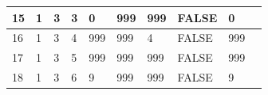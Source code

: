 \begin{table}[h!]
\begin{tabular}{|l|l|l|l|l|l|l|l|l|l|}
		15                                                          & 1                                                       & 3                                                       & 3                                                       & 0                                                                        & 999                                                                      & 999                                                                      & FALSE                                                           & 0                                                                        &                                                               \\ \hline
		16                                                          & 1                                                       & 3                                                       & 4                                                       & 999                                                                      & 999                                                                      & 4                                                                        & FALSE                                                           & 999                                                                      &                                                               \\ \hline
		17                                                          & 1                                                       & 3                                                       & 5                                                       & 999                                                                      & 999                                                                      & 999                                                                      & FALSE                                                           & 999                                                                      &                                                               \\ \hline
		18                                                          & 1                                                       & 3                                                       & 6                                                       & 9                                                                        & 999                                                                      & 999                                                                      & FALSE                                                           & 9                                                                        &                                                               \\ \hline

\end{tabular}
\end{table}
